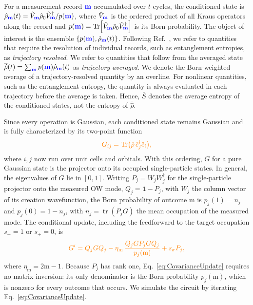 \documentclass[aps,prb,10pt,twocolumn,superscriptaddress,longbibliography,floatfix]{revtex4-2}
\newcommand{\Id}{\mathbf{1}}
\newcommand{\rec}{\mathbf m}   %
\newcommand{\newtext}[1]{{\color{blue}#1}}
\newcommand{\claudeadd}[1]{{\color{orange}#1}}
\begin{document}
For a measurement record $\newtext{\rec}$ accumulated over $t$ cycles, the conditioned state is $\hat\rho_{\newtext{\rec}}(t)=\hat V_{\newtext{\rec}}\hat\rho_0\hat V_{\newtext{\rec}}^\dagger/p(\newtext{\rec})$, where $\hat V_{\newtext{\rec}}$ is the ordered product of all Kraus operators along the record and $p(\newtext{\rec})=\Tr[\hat V_{\newtext{\rec}}\hat\rho_0\hat V_{\newtext{\rec}}^\dagger]$ is its Born probability. The object of interest is the ensemble $\{p(\newtext{\rec}),\hat\rho_{\newtext{\rec}}(t)\}$. Following Ref.~\cite{BhuiyanPanJian2026}, we refer to quantities that require the resolution of individual records, such as entanglement entropies, as \emph{trajectory resolved}. We refer to quantities that follow from the averaged state $\overline{\hat\rho}(t)=\sum_{\newtext{\rec}}p(\newtext{\rec})\hat\rho_{\newtext{\rec}}(t)$ as \emph{trajectory averaged}. We denote the Born-weighted average of a trajectory-resolved quantity by an overline. For nonlinear quantities, such as the entanglement entropy, the quantity is always evaluated in each trajectory before the average is taken. Hence, $\overline{S}$ denotes the average entropy of the conditioned states, not the entropy of $\overline{\hat\rho}$.

Since every operation is Gaussian, each conditioned state remains Gaussian and is fully characterized by its two-point function
\begin{equation}
    \claudeadd{G_{ij}=\Tr\!\big(\hat\rho\,\hat c_j^\dagger\hat c_i\big),}
    \label{eq:TwoPoint}
\end{equation}
where $i,j$ now run over unit cells and orbitals. With this ordering, \claudeadd{$G$} for a pure Gaussian state is the projector onto its occupied single-particle states. In general, \newtext{the eigenvalues of $G$} lie in $[0,1]$. Writing \claudeadd{$P_j=W_jW_j^\dagger$} for the single-particle projector onto the measured OW mode, $Q_j=\Id-P_j$, \newtext{with $W_j$ the column vector of its creation wavefunction,} the Born probability of outcome \newtext{$\mathrm m$} is \claudeadd{$p_j(1)=n_j$ and $p_j(0)=1-n_j$, with $n_j=\operatorname{tr}(P_jG)$ the mean occupation of the measured mode}. The conditional update, including the feedforward to the target occupation $s_-=1$ or $s_+=0$, is~\cite{bravyi2004lagrangian,BhuiyanPanJian2026}
\begin{equation}
    \claudeadd{G'=Q_jGQ_j-\eta_{\mathrm m}\,\frac{Q_jGP_jGQ_j}{p_j(\mathrm m)}+s_\sigma P_j,}
    \label{eq:CovarianceUpdate}
\end{equation}
\claudeadd{where $\eta_{\mathrm m}=2\mathrm m-1$. Because $P_j$ has rank one, Eq.~\eqref{eq:CovarianceUpdate} requires no matrix inversion: its only denominator is the Born probability $p_j(\mathrm m)$, which is nonzero for every outcome that occurs.} We simulate the circuit by iterating Eq.~\eqref{eq:CovarianceUpdate}.
\end{document}
